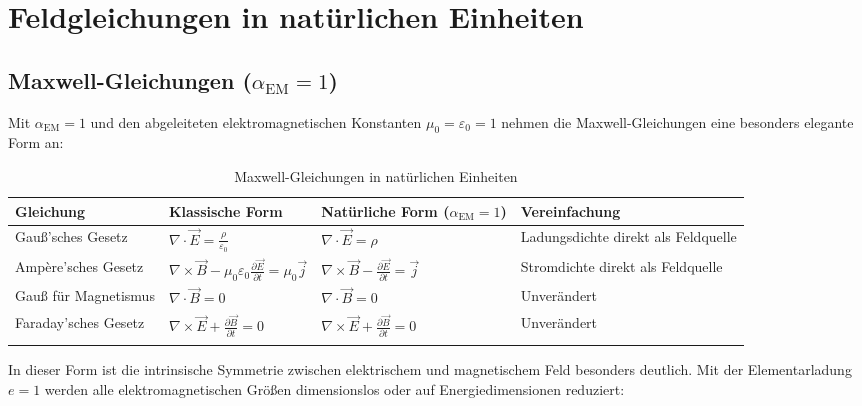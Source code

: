 \documentclass[12pt,a4paper]{article}
\newcommand{\alphaEM}{\alpha_{\text{EM}}}
\begin{document}
	\section{Feldgleichungen in natürlichen Einheiten}
	
	\subsection{Maxwell-Gleichungen ($\alphaEM = 1$)}
	
	Mit $\alphaEM = 1$ und den abgeleiteten elektromagnetischen Konstanten $\mu_0 = \varepsilon_0 = 1$ nehmen die Maxwell-Gleichungen eine besonders elegante Form an:
	
	\begin{table}[ht]
		\centering
		\begin{adjustbox}{scale=0.75}
			\begin{tabular}{llll}
				\hline
				\textbf{Gleichung} & \textbf{Klassische Form} & \textbf{Natürliche Form ($\alphaEM = 1$)} & \textbf{Vereinfachung} \\
				\hline
				Gauß’sches Gesetz & $\nabla\cdot\vec{E} = \frac{\rho}{\varepsilon_0}$ & $\nabla\cdot\vec{E} = \rho$ & Ladungsdichte direkt als Feldquelle \\
				Ampère’sches Gesetz & $\nabla\times\vec{B} - \mu_0\varepsilon_0\frac{\partial\vec{E}}{\partial t} = \mu_0\vec{j}$ & $\nabla\times\vec{B} - \frac{\partial\vec{E}}{\partial t} = \vec{j}$ & Stromdichte direkt als Feldquelle \\
				Gauß für Magnetismus & $\nabla\cdot\vec{B} = 0$ & $\nabla\cdot\vec{B} = 0$ & Unverändert \\
				Faraday’sches Gesetz & $\nabla\times\vec{E} + \frac{\partial\vec{B}}{\partial t} = 0$ & $\nabla\times\vec{E} + \frac{\partial\vec{B}}{\partial t} = 0$ & Unverändert \\
				\hline
				\multicolumn{3}{c}{} \\
				\hline
			\end{tabular}
		\end{adjustbox}
		\caption{Maxwell-Gleichungen in natürlichen Einheiten}
		\label{tab:maxwell}
	\end{table}
	
	In dieser Form ist die intrinsische Symmetrie zwischen elektrischem und magnetischem Feld besonders deutlich. Mit der Elementarladung $e = 1$ werden alle elektromagnetischen Größen dimensionslos oder auf Energiedimensionen reduziert:
	
\end{document}
